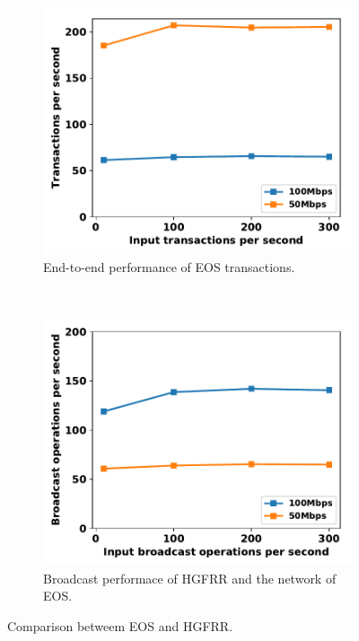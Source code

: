 \begin{figure}[ht]
  \centering
    \begin{subfigure}[b]{0.23\textwidth}
    \includegraphics[width=\textwidth]{figures/eos_hgfr_e2e_tps_on_input.pdf}
    \caption{End-to-end performance of EOS transactions.}
    \label{eos_hgfr_e2e_tps_on_input}
    \end{subfigure}
    ~
    \begin{subfigure}[b]{0.23\textwidth}
	  \includegraphics[width=\textwidth]{figures/eos_hgfr_micro_tps_on_input.pdf}
	  \caption{Broadcast performace of HGFRR and the network of EOS.}
    \label{eos_hgfr_micro_tps_on_input}
    \end{subfigure}

	\caption{Comparison betweem EOS and HGFRR.}
	\label{fig_eos_hgfr}
	\vspace{-0.5cm}
\end{figure}
  

